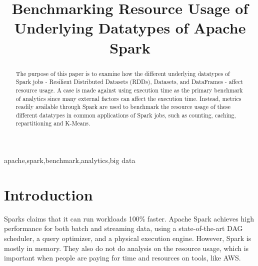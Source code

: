 \documentclass[conference]{IEEEtran}
\begin{document}
\title{Benchmarking Resource Usage of Underlying Datatypes of Apache Spark\\
}

\author{
\and
{}
\and
{}
}

\maketitle

\begin{abstract}
The purpose of this paper is to examine how the different underlying datatypes of Spark jobs - Resilient Distributed Datasets (RDDs),
Datasets, and DataFrames - affect resource usage.
A case is made against using execution time as the primary benchmark of analytics since many external factors can affect the execution time.
Instead, metrics readily available through Spark are used to benchmark the resource usage of these different datatypes in common applications of Spark jobs, such as counting, caching, repartitioning and K-Means.
\end{abstract}

\begin{IEEEkeywords}
apache,spark,benchmark,analytics,big data
\end{IEEEkeywords}

\section{Introduction}
Sparks claims that it can run workloads 100$\%$ faster. Apache Spark achieves high performance for both batch and streaming data, using a state-of-the-art DAG scheduler, a query optimizer, and a physical execution engine. However, Spark is mostly in memory. They also do not do analysis on the resource usage, which is important when people are paying for time and resources on tools, like AWS.
\end{document}
